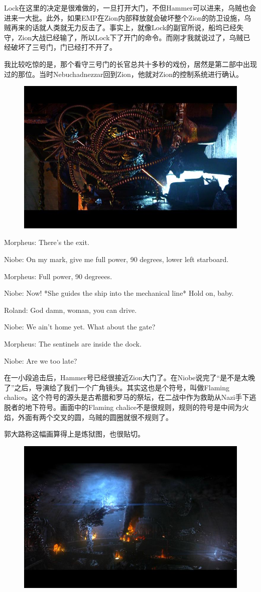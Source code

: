 \documentclass[UTF8]{ctexart}
\newenvironment{myquote}{\color{green} \setlength{\leftskip}{6em} \setlength{\rightskip}{4em} \setlength{\parindent}{-2em}}{\par}
\begin{document}
Lock在这里的决定是很难做的，一旦打开大门，不但Hammer可以进来，乌贼也会进来一大批。此外，如果EMP在Zion内部释放就会破坏整个Zion的防卫设施，乌贼再来的话就人类就无力反击了。事实上，就像Lock的副官所说，船坞已经失守，Zion大战已经输了，所以Lock下了开门的命令。而刚才我就说过了，乌贼已经破坏了三号门，门已经打不开了。

我比较吃惊的是，那个看守三号门的长官总共十多秒的戏份，居然是第二部中出现过的那位。当时Nebuchadnezzar回到Zion，他就对Zion的控制系统进行确认。

\begin{figure}[htb]
\centering
\includegraphics[width=0.5\linewidth]{fig/2c70c9fc45bf7bfdfc037fb0.jpg}
\end{figure}

\begin{myquote}
Morpheus: There's the exit.

Niobe: On my mark, give me full power, 90 degrees, lower left starboard.

Morpheus: Full power, 90 degreees.

Niobe: Now! *She guides the ship into the mechanical line* Hold on, baby.

Roland: God damn, woman, you can drive.

Niobe: We ain't home yet. What about the gate?

Morpheus: The sentinels are inside the dock.

Niobe: Are we too late?
\end{myquote}

在一小段追击后，Hammer号已经很接近Zion大门了。在Niobe说完了“是不是太晚了”之后，导演给了我们一个广角镜头。其实这也是个符号，叫做Flaming chalice。这个符号的源头是古希腊和罗马的祭坛，在二战中作为救助从Nazi手下逃脱者的地下符号。画面中的Flaming chalice不是很规则，规则的符号是中间为火焰，外面有两个交叉的圆，乌贼的圆圈就很不规则了。

郭大路称这幅画算得上是炼狱图，也很贴切。

\begin{figure}[htb]
\centering
\includegraphics[width=0.5\linewidth]{fig/12f6a5c2f36f6a1b0ef477b0.jpg}
\end{figure}
\end{document}
